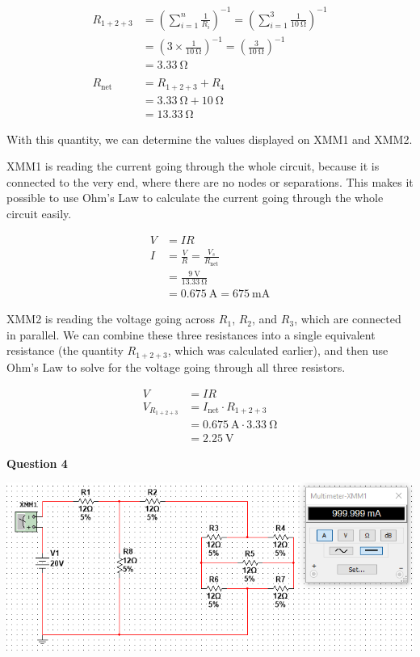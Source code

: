 \documentclass{article}
\begin{document}
\begin{align*}
    R_{1+2+3}
    &= \left(\sum_{i=1}^n \frac1{R_i} \right)^{-1} = \left( \sum_{i=1}^3 \frac1{\SI{10}{\ohm}} \right)^{-1} \\ 
    &= \left( 3 \times \frac1{\SI{10}{\ohm}} \right)^{-1} = \left( \frac3{\SI{10}{\ohm}} \right)^{-1}\\ 
    &= \SI{3.33}{\ohm}\\ 
    \\
    R_{\text{net}} &= R_{1+2+3} + R_4\\ 
    &= \SI{3.33}{\ohm} + \SI{10}{\ohm}\\ 
    &= \SI{13.33}{\ohm}
\end{align*}

With this quantity, we can determine the values displayed on XMM1 and XMM2.

XMM1 is reading the current going through the whole circuit, because it is
connected to the very end, where there are no nodes or separations. This makes
it possible to use Ohm's Law to calculate the current going through the whole
circuit easily.

\begin{align*}
    V &= IR\\ 
    I &= \frac{V}{R} = \frac{V_s}{R_{\text{net}}}\\ 
    &= \frac{ \SI{9}{\volt} }{ \SI{13.33}{\ohm} }\\
    &= \SI{0.675}{\ampere} = \SI{675}{\milli\ampere}
\end{align*}

XMM2 is reading the voltage going across $R_1$, $R_2$, and $R_3$, which are
connected in parallel. We can combine these three resistances into a single
equivalent resistance (the quantity $R_{1+2+3}$, which was calculated
earlier), and then use Ohm's Law to solve for the voltage going through
all three resistors.

\begin{align*}
    V &= IR\\
    V_{R_{1+2+3}} &= I_{\text{net}} \cdot R_{1+2+3}\\
    &= \SI{0.675}{\ampere} \cdot \SI{3.33}{\ohm}\\
    &= \SI{2.25}{\volt}
\end{align*}

\textbf{Question 4}

\includegraphics[width=\textwidth]{Lab3Screenshot4.png}
\end{document}
